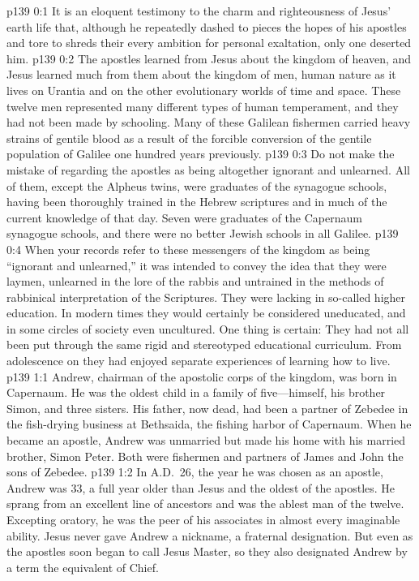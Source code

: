 \author{Midwayer Commission}
\vs p139 0:1 It is an eloquent testimony to the charm and righteousness of Jesus’ earth life that, although he repeatedly dashed to pieces the hopes of his apostles and tore to shreds their every ambition for personal exaltation, only one deserted him.
\vs p139 0:2 The apostles learned from Jesus about the kingdom of heaven, and Jesus learned much from them about the kingdom of men, human nature as it lives on Urantia and on the other evolutionary worlds of time and space. These twelve men represented many different types of human temperament, and they had not been made  by schooling. Many of these Galilean fishermen carried heavy strains of gentile blood as a result of the forcible conversion of the gentile population of Galilee one hundred years previously.
\pc \vs p139 0:3 Do not make the mistake of regarding the apostles as being altogether ignorant and unlearned. All of them, except the Alpheus twins, were graduates of the synagogue schools, having been thoroughly trained in the Hebrew scriptures and in much of the current knowledge of that day. Seven were graduates of the Capernaum synagogue schools, and there were no better Jewish schools in all Galilee.
\vs p139 0:4 When your records refer to these messengers of the kingdom as being “ignorant and unlearned,” it was intended to convey the idea that they were laymen, unlearned in the lore of the rabbis and untrained in the methods of rabbinical interpretation of the Scriptures. They were lacking in so\hyp{}called higher education. In modern times they would certainly be considered uneducated, and in some circles of society even uncultured. One thing is certain: They had not all been put through the same rigid and stereotyped educational curriculum. From adolescence on they had enjoyed separate experiences of learning how to live.
\vs p139 1:1 Andrew, chairman of the apostolic corps of the kingdom, was born in Capernaum. He was the oldest child in a family of five---himself, his brother Simon, and three sisters. His father, now dead, had been a partner of Zebedee in the fish\hyp{}drying business at Bethsaida, the fishing harbor of Capernaum. When he became an apostle, Andrew was unmarried but made his home with his married brother, Simon Peter. Both were fishermen and partners of James and John the sons of Zebedee.
\vs p139 1:2 In A.D.~26, the year he was chosen as an apostle, Andrew was 33, a full year older than Jesus and the oldest of the apostles. He sprang from an excellent line of ancestors and was the ablest man of the twelve. Excepting oratory, he was the peer of his associates in almost every imaginable ability. Jesus never gave Andrew a nickname, a fraternal designation. But even as the apostles soon began to call Jesus Master, so they also designated Andrew by a term the equivalent of Chief.
